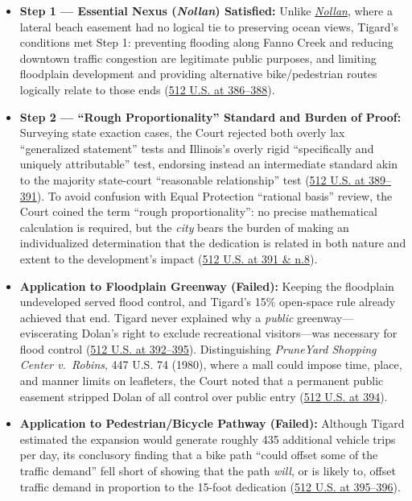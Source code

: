 \documentclass[12pt]{article}
\begin{document}
\begin{itemize}
  \item \textbf{Step 1 --- Essential Nexus (\emph{Nollan}) Satisfied:} Unlike \href{https://supreme.justia.com/cases/federal/us/483/825/}{\emph{Nollan}}, where a lateral beach easement had no logical tie to preserving ocean views, Tigard's conditions met Step 1: preventing flooding along Fanno Creek and reducing downtown traffic congestion are legitimate public purposes, and limiting floodplain development and providing alternative bike/pedestrian routes logically relate to those ends (\href{https://supreme.justia.com/cases/federal/us/512/374/}{512 U.S. at 386--388}).
  \item \textbf{Step 2 --- ``Rough Proportionality'' Standard and Burden of Proof:} Surveying state exaction cases, the Court rejected both overly lax ``generalized statement'' tests and Illinois's overly rigid ``specifically and uniquely attributable'' test, endorsing instead an intermediate standard akin to the majority state-court ``reasonable relationship'' test (\href{https://supreme.justia.com/cases/federal/us/512/374/}{512 U.S. at 389--391}). To avoid confusion with Equal Protection ``rational basis'' review, the Court coined the term ``rough proportionality'': no precise mathematical calculation is required, but the \emph{city} bears the burden of making an individualized determination that the dedication is related in both nature and extent to the development's impact (\href{https://supreme.justia.com/cases/federal/us/512/374/}{512 U.S. at 391 \& n.8}).
  \item \textbf{Application to Floodplain Greenway (Failed):} Keeping the floodplain undeveloped served flood control, and Tigard's 15\% open-space rule already achieved that end. Tigard never explained why a \emph{public} greenway---eviscerating Dolan's right to exclude recreational visitors---was necessary for flood control (\href{https://supreme.justia.com/cases/federal/us/512/374/}{512 U.S. at 392--395}). Distinguishing \emph{PruneYard Shopping Center v.\ Robins}, 447 U.S. 74 (1980), where a mall could impose time, place, and manner limits on leafleters, the Court noted that a permanent public easement stripped Dolan of all control over public entry (\href{https://supreme.justia.com/cases/federal/us/512/374/}{512 U.S. at 394}).
  \item \textbf{Application to Pedestrian/Bicycle Pathway (Failed):} Although Tigard estimated the expansion would generate roughly 435 additional vehicle trips per day, its conclusory finding that a bike path ``could offset some of the traffic demand'' fell short of showing that the path \emph{will}, or is likely to, offset traffic demand in proportion to the 15-foot dedication (\href{https://supreme.justia.com/cases/federal/us/512/374/}{512 U.S. at 395--396}).
\end{itemize}
\end{document}
